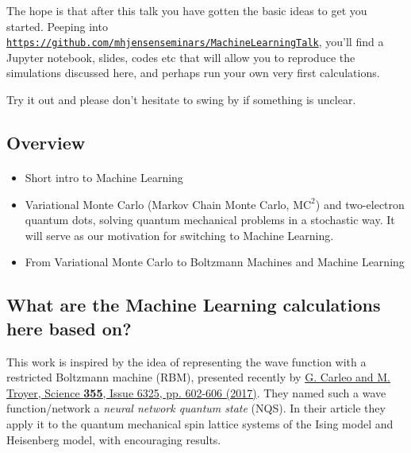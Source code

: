 \documentclass[%
oneside,                 %
final,                   %
10pt]{article}
\begin{document}
The hope is that after this talk you have gotten the basic ideas to get you started. Peeping into \href{{https://github.com/mhjensenseminars/MachineLearningTalk}}{\nolinkurl{https://github.com/mhjensenseminars/MachineLearningTalk}}, you'll find a Jupyter notebook, slides, codes etc that will allow you to reproduce the simulations discussed here, and perhaps run your own very first calculations.

Try it out and please don't hesitate to swing by if something is unclear.



\subsection{Overview}

\paragraph{}
\begin{itemize}
\item Short intro to Machine Learning

\item Variational Monte Carlo (Markov Chain Monte Carlo, $\mathrm{MC}^2$) and two-electron quantum dots, solving quantum mechanical problems in a stochastic way. It  will serve as  our motivation for switching to Machine Learning. 

\item From Variational Monte Carlo to Boltzmann Machines and Machine Learning
\end{itemize}

\noindent



\subsection{What are the Machine Learning calculations here based on?}

This work is inspired by the idea of representing the wave function with
a restricted Boltzmann machine (RBM), presented recently by \href{{http://science.sciencemag.org/content/355/6325/602}}{G. Carleo and M. Troyer, Science \textbf{355}, Issue 6325, pp. 602-606 (2017)}. They
named such a wave function/network a \emph{neural network quantum state} (NQS). In their article they apply it to the quantum mechanical
spin lattice systems of the Ising model and Heisenberg model, with
encouraging results.
\end{document}
